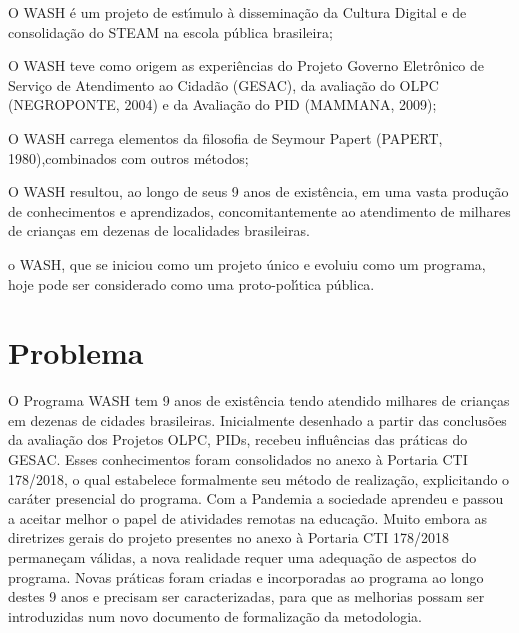 \documentclass[
12pt,		%
openright,	%
twoside,  %
a4paper,			%
chapter=TITLE,		%
english,			%
french,				%
spanish,			%
brazil				%
]{USPSC-classe/USPSC}
\begin{document}
\begin{alineas}
\item O WASH \'e um projeto de est\'{\i}mulo \`a dissemina\c{c}\~ao da Cultura Digital e de consolida\c{c}\~ao do STEAM na escola p\'ublica brasileira;
\item O WASH teve como origem as experi\^encias do Projeto Governo Eletr\^onico de Servi\c{c}o de Atendimento ao Cidad\~ao (GESAC), da avalia\c{c}\~ao do OLPC (NEGROPONTE, 2004) e da Avalia\c{c}\~ao do PID (MAMMANA, 2009);
\item O WASH carrega elementos da filosofia de Seymour Papert (PAPERT, 1980),combinados com outros m\'etodos;
\item O WASH resultou, ao longo de seus 9 anos de exist\^encia, em uma vasta produ\c{c}\~ao de conhecimentos e aprendizados, concomitantemente ao atendimento de milhares de crian\c{c}as em dezenas de localidades brasileiras.
\item o WASH, que se iniciou como um projeto \'unico e evoluiu como um programa, hoje pode ser considerado como uma proto-pol\'{\i}tica p\'ublica.
\end{alineas}

\section[Problema]{Problema}\label{Problema}
O Programa WASH tem 9 anos de exist\^encia tendo atendido milhares de crian\c{c}as em dezenas de cidades brasileiras. Inicialmente desenhado a partir das conclus\~oes da avalia\c{c}\~ao dos Projetos OLPC, PIDs, recebeu influ\^encias das pr\'aticas do GESAC. Esses conhecimentos foram consolidados no anexo \`a Portaria CTI 178/2018, o qual estabelece formalmente seu m\'etodo de realiza\c{c}\~ao, explicitando o car\'ater presencial do programa. Com a Pandemia a sociedade aprendeu e passou a aceitar melhor o papel de atividades remotas na educa\c{c}\~ao. Muito embora as diretrizes gerais do projeto presentes no anexo \`a Portaria CTI 178/2018 permane\c{c}am v\'alidas, a nova realidade requer uma adequa\c{c}\~ao de aspectos do programa. Novas pr\'aticas foram criadas e incorporadas ao programa ao longo destes 9 anos e precisam ser caracterizadas, para que as melhorias possam ser introduzidas num novo documento de formaliza\c{c}\~ao da metodologia.
\end{document}
